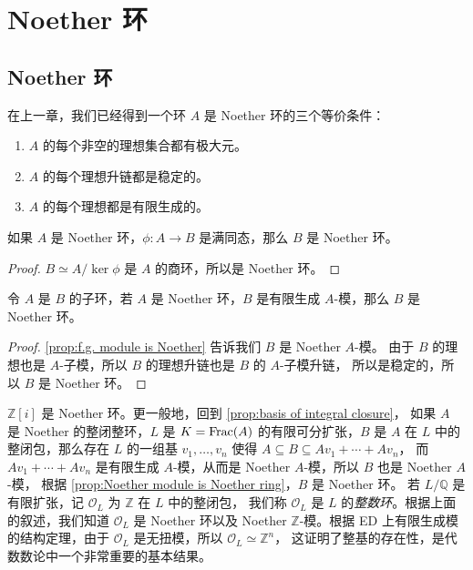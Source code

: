 \chapter{Noether 环}

\section{Noether 环}

在上一章，我们已经得到一个环 $A$ 是 Noether 环的三个等价条件：
\begin{enumerate}
  \item $A$ 的每个非空的理想集合都有极大元。
  \item $A$ 的每个理想升链都是稳定的。
  \item $A$ 的每个理想都是有限生成的。
\end{enumerate}

\begin{proposition}
  如果 $A$ 是 Noether 环，$\phi:A\to B$ 是满同态，那么 $B$ 是 Noether 环。
\end{proposition}
\begin{proof}
  $B\simeq A/\ker\phi$ 是 $A$ 的商环，所以是 Noether 环。
\end{proof}

\begin{proposition}\label{prop:Noether module is Noether ring}
  令 $A$ 是 $B$ 的子环，若 $A$ 是 Noether 环，$B$ 是有限生成 $A$-模，那么 $B$
  是 Noether 环。
\end{proposition}
\begin{proof}
  \autoref{prop:f.g. module is Noether} 告诉我们 $B$ 是 Noether $A$-模。
  由于 $B$ 的理想也是 $A$-子模，所以 $B$ 的理想升链也是 $B$ 的 $A$-子模升链，
  所以是稳定的，所以 $B$ 是 Noether 环。
\end{proof}

\begin{example}
  $\mathbb{Z}[i]$ 是 Noether 环。更一般地，回到 \autoref{prop:basis of integral closure}，
  如果 $A$ 是 Noether 的整闭整环，$L$ 是 $K=\operatorname{Frac}(A)$ 的有限可分扩张，$B$ 是 $A$
  在 $L$ 中的整闭包，那么存在 $L$ 的一组基 $v_1,\dots,v_n$ 使得 $A\subseteq B\subseteq Av_1+\cdots+Av_n$，
  而 $Av_1+\cdots+Av_n$ 是有限生成 $A$-模，从而是 Noether $A$-模，所以 $B$ 也是 Noether $A$-模，
  根据 \autoref{prop:Noether module is Noether ring}，$B$ 是 Noether 环。
  若 $L/\mathbb{Q}$ 是有限扩张，记 $\mathcal{O}_L$ 为 $\mathbb{Z}$ 在 $L$ 中的整闭包，
  我们称 $\mathcal{O}_L$ 是 $L$ 的\emph{整数环}。根据上面的叙述，我们知道 $\mathcal{O}_L$
  是 Noether 环以及 Noether $\mathbb{Z}$-模。根据 ED 上有限生成模的结构定理，由于
  $\mathcal{O}_L$ 是无扭模，所以 $\mathcal{O}_L\simeq\mathbb{Z}^n$，
  这证明了整基的存在性，是代数数论中一个非常重要的基本结果。
\end{example}


